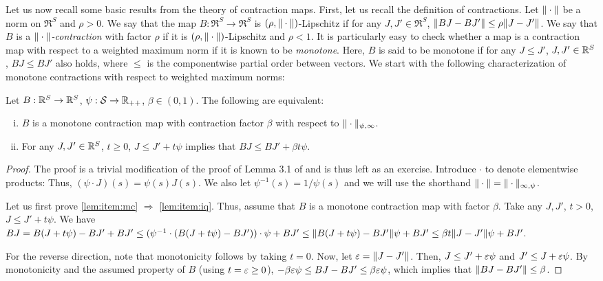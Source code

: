 \documentclass[twocolumn]{IEEEtran}
\begin{document}
Let us now recall some basic results from the theory of contraction maps.
First, let us recall the definition of contractions. Let $\|\cdot\|$ be a norm on $\Re^S$ and $\rho>0$.
We say that the map $B: \Re^S \to \Re^S$ is $(\rho,\|\cdot\|)$-Lipschitz if for any $J,J'\in \Re^S$, $\| BJ - BJ' \| \le \rho \|J-J'\|$. We say that $B$ is a \emph{$\|\cdot\|$-contraction} with factor $\rho$
if it is $(\rho,\|\cdot\|)$-Lipschitz and $\rho<1$. It is particularly easy to check whether a map is a contraction map with respect to a weighted maximum norm
if it is known to be \emph{monotone}.
Here, $B$ is said to be monotone if for any $J\le J'$, $J,J'\in \mathbb{R}^S$, $BJ \le BJ'$ also holds, where $\le$ is the componentwise
partial order between vectors. We start with the following characterization of monotone contractions with respect to weighted maximum norms:
\begin{lemma}
\label{lem:maxnormmn}
Let $B:\mathbb{R}^S \to \mathbb{R}^S$, $\psi: \mathcal{S} \to \mathbb{R}_{++}$, $\beta\in (0,1)$.
The following are equivalent:
\begin{enumerate}[(i)]
\item $B$ is a monotone contraction map with contraction factor $\beta$ with respect to $\|\cdot\|_{\psi,\infty}$.
\label{lem:item:mc}
\item For any $J,J'\in \mathbb{R}^S$, $t\ge 0$, $J \le J' + t \psi$ implies that $BJ \le BJ' + \beta t \psi$.
\label{lem:item:iq}
\end{enumerate}
\end{lemma}
\begin{proof}
The proof is a trivial modification of the proof of Lemma 3.1 of \cite{Kall17} and is thus left as an exercise.
Introduce $\cdot$ to denote elementwise products: Thus, $(\psi \cdot J)(s) = \psi(s) J(s)$.
We also let $\psi^{-1}(s) = 1/\psi(s)$ and we will use the shorthand $\|\cdot\| = \|\cdot\|_{\infty,\psi}$.

Let us first prove \eqref{lem:item:mc} $\Rightarrow $ \eqref{lem:item:iq}.
Thus, assume that $B$ is a monotone contraction
map with factor $\beta$. Take any $J,J'$, $t>0$, $J \le J'+ t\psi$.
We have $BJ = B(J + t \psi) - B J' + B J' \le (\psi^{-1} \cdot (B(J + t \psi) - B J' ))\cdot \psi + BJ'
\le \|B(J+t\psi) - BJ'\| \psi + BJ' \le \beta t \|J-J'\| \psi +  BJ'$.

For the reverse direction, note that monotonicity follows by taking $t=0$.
Now, let $\varepsilon = \|J-J'\|$. Then, $J \le J'+ \varepsilon \psi$ and $J' \le J+\varepsilon \psi$.
By monotonicity and the assumed property of $B$ (using $t=\varepsilon\ge 0$),
$-\beta \varepsilon \psi \le BJ - BJ' \le \beta \varepsilon \psi$, which implies
that $\|BJ - BJ'\| \le \beta$.
\fi
\end{proof}
\end{document}
